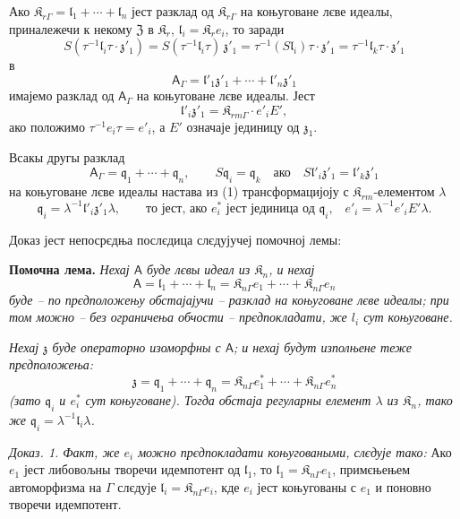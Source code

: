 \documentclass[11pt]{article}
\begin{document}
Ако \(\mathfrak K_{r\Gamma}=\mathfrak l_1+\cdots+\mathfrak l_n\) јест разклад од \(\mathfrak K_{r\Gamma}\) на коњуговане лєве идеалы, приналежечи к некому \(\mathfrak Z\) в \(\mathfrak K_r\), \(\mathfrak l_i=\mathfrak K_re_i\), то заради
\[
S(\tau^{-1}\mathfrak l_i\tau\cdot\mathfrak z'_1)
=S(\tau^{-1}\mathfrak l_i\tau)\,\mathfrak z'_1
=\tau^{-1}(S\mathfrak l_i)\tau\cdot\mathfrak z'_1
=\tau^{-1}\mathfrak l_k\tau\cdot\mathfrak z'_1
\]
в
\[
\tag{1}
\mathsf{A}_\Gamma=\mathfrak l'_1\mathfrak z'_1+\cdots+\mathfrak l'_n\mathfrak z'_1
\]
имајемо разклад од \(\mathsf{A}_\Gamma\) на коњуговане лєве идеалы. Јест
\[
\mathfrak l'_i\mathfrak z'_1=\mathfrak K_{rm\Gamma}\cdot e'_iE',
\]
ако положимо \(\tau^{-1}e_i\tau=e'_i\), а \(E'\) означаје јединицу од \(\mathfrak z_1\).

Всакы другы разклад
\[
\tag{2}
\mathsf{A}_\Gamma=\mathfrak q_1+\cdots+\mathfrak q_n,\qquad
S\mathfrak q_i=\mathfrak q_k\quad\text{ако}\quad
S\mathfrak l'_i\mathfrak z'_1=\mathfrak l'_k\mathfrak z'_1
\]
на коњуговане лєве идеалы настава из (1) трансформацијоју с \(\mathfrak K_{rm}\)-елементом \(\lambda\)
\[
\mathfrak q_i=\lambda^{-1}\mathfrak l'_i\mathfrak z'_1\lambda,
\qquad
\text{то јест, ако \(e_i^*\) јест јединица од \(\mathfrak q_i\),}\quad
e'_i=\lambda^{-1}e'_iE'\lambda.
\]

Доказ јест непосрєдња послєдица слєдујучеј помочној лемы:

\textbf{Помочна лема.} \emph{Нехај \(\mathsf{A}\) буде лєвы идеал из \(\mathfrak K_n\), и нехај}
\[
\mathsf{A}=\mathfrak l_1+\cdots+\mathfrak l_n
=\mathfrak K_{n\Gamma}e_1+\cdots+\mathfrak K_{n\Gamma}e_n
\]
\emph{буде -- по прєдположењу обстајајучи -- разклад на коњуговане лєве идеалы; при том можно -- без ограничења обчости -- прєдпокладати, же \(l_i\) сут коњуговане.}

\emph{Нехај \(\mathfrak z\) буде операторно изоморфны с \(\mathsf{A}\); и нехај будут изполњене теже прєдположења:}
\[
\mathfrak z=\mathfrak q_1+\cdots+\mathfrak q_n
=\mathfrak K_{n\Gamma}e_1^*+\cdots+\mathfrak K_{n\Gamma}e_n^*
\]
\emph{(зато \(\mathfrak q_i\) и \(e_i^*\) сут коњуговане). Тогда обстаја регуларны елемент \(\lambda\) из \(\mathfrak K_n\), тако же \(\mathfrak q_i=\lambda^{-1}\mathfrak l_i\lambda\).}

\emph{Доказ. 1. Факт, же \(e_i\) можно прєдпокладати коњуговаными, слєдује тако:} Ако \(e_1\) јест либовољны творечи идемпотент од \(\mathfrak l_1\), то \(\mathfrak l_1=\mathfrak K_{n\Gamma}e_1\), примєњењем автоморфизма на \(\Gamma\) слєдује \(\mathfrak l_i=\mathfrak K_{n\Gamma}e_i\), кде \(e_i\) јест коњугованы с \(e_1\) и поновно творечи идемпотент.
\end{document}
